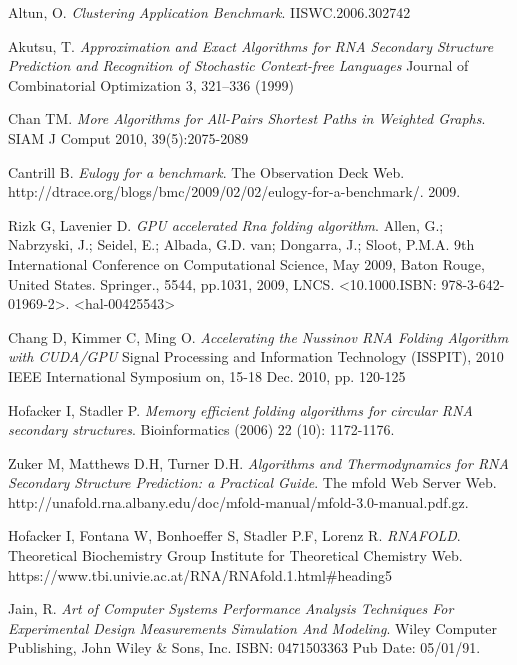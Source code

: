 \documentclass[12pt]{article}
\begin{document}
\begin{thebibliography}{56}
Altun, O.
\textit{Clustering Application Benchmark}.
IISWC.2006.302742

Akutsu, T.
\textit{Approximation and Exact Algorithms for RNA
Secondary Structure Prediction and Recognition
of Stochastic Context-free Languages}
Journal of Combinatorial Optimization 3, 321–336 (1999)

Chan TM.
\textit{More Algorithms for All-Pairs Shortest Paths in Weighted
Graphs}.
SIAM J Comput 2010, 39(5):2075-2089

Cantrill B.
\textit{Eulogy for a benchmark}.
The Observation Deck Web. http://dtrace.org/blogs/bmc/2009/02/02/eulogy-for-a-benchmark/.
2009.

Rizk G, Lavenier D.
\textit{GPU accelerated Rna folding algorithm}.
Allen, G.; Nabrzyski, J.; Seidel, E.; Albada, G.D. van; Dongarra, J.; Sloot, P.M.A. 9th International Conference on Computational Science, May 2009, Baton Rouge, United States. Springer., 5544, pp.1031, 2009, LNCS. <10.1000.ISBN: 978-3-642-01969-2>. <hal-00425543>

Chang D, Kimmer C, Ming O.
\textit{Accelerating the Nussinov RNA Folding Algorithm with CUDA/GPU}
Signal Processing and Information Technology (ISSPIT), 2010 IEEE International Symposium on, 15-18 Dec. 2010, pp. 120-125

Hofacker I, Stadler P.
\textit{Memory efficient folding algorithms for circular RNA secondary structures}.
Bioinformatics (2006) 22 (10): 1172-1176.

Zuker M, Matthews D.H, Turner D.H.
\textit{Algorithms and Thermodynamics for RNA
Secondary Structure Prediction:
a Practical Guide}.
The mfold Web Server Web. http://unafold.rna.albany.edu/doc/mfold-manual/mfold-3.0-manual.pdf.gz.

Hofacker I, Fontana W, Bonhoeffer S, Stadler P.F, Lorenz R.
\textit{RNAFOLD}.
Theoretical Biochemistry Group Institute for Theoretical Chemistry Web. https://www.tbi.univie.ac.at/RNA/RNAfold.1.html\#heading5

Jain, R.
\textit{Art of Computer Systems Performance Analysis Techniques For Experimental Design Measurements Simulation And Modeling}.
Wiley Computer Publishing, John Wiley \& Sons, Inc.
ISBN: 0471503363 Pub Date: 05/01/91.

\end{thebibliography}
\end{document}
